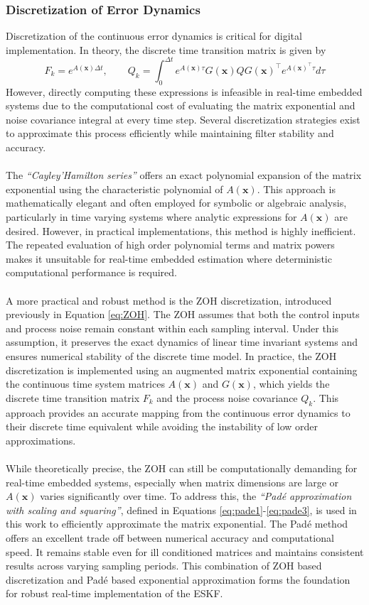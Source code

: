 \subsubsection{Discretization of Error Dynamics}
Discretization of the continuous error dynamics is critical for digital implementation. In theory, the discrete time transition matrix is given by
$$
    F_k = e^{A(\mathbf{x})\Delta t}, \qquad
    Q_k = \int_0^{\Delta t} e^{A(\mathbf{x})\tau} G(\mathbf{x}) Q G(\mathbf{x})^\top e^{A(\mathbf{x})^\top\tau} d\tau
$$
However, directly computing these expressions is infeasible in real-time embedded systems due to the computational cost of evaluating the matrix exponential and noise covariance integral at every time step. Several discretization strategies exist to approximate this process efficiently while maintaining filter stability and accuracy.  
\\ \\
The \textit{``Cayley'Hamilton series''} offers an exact polynomial expansion of the matrix exponential using the characteristic polynomial of $A(\mathbf{x})$. This approach is mathematically elegant and often employed for symbolic or algebraic analysis, particularly in time varying systems where analytic expressions for $A(\mathbf{x})$ are desired. However, in practical implementations, this method is highly inefficient. The repeated evaluation of high order polynomial terms and matrix powers makes it unsuitable for real-time embedded estimation where deterministic computational performance is required.  
\\ \\
A more practical and robust method is the ZOH discretization, introduced previously in Equation \ref{eq:ZOH}. The ZOH assumes that both the control inputs and process noise remain constant within each sampling interval. Under this assumption, it preserves the exact dynamics of linear time invariant systems and ensures numerical stability of the discrete time model. In practice, the ZOH discretization is implemented using an augmented matrix exponential containing the continuous time system matrices $A(\mathbf{x})$ and $G(\mathbf{x})$, which yields the discrete time transition matrix $F_k$ and the process noise covariance $Q_k$. This approach provides an accurate mapping from the continuous error dynamics to their discrete time equivalent while avoiding the instability of low order approximations.  
\\ \\
While theoretically precise, the ZOH can still be computationally demanding for real-time embedded systems, especially when matrix dimensions are large or $A(\mathbf{x})$ varies significantly over time. To address this, the \textit{``Padé approximation with scaling and squaring''}, defined in Equations \ref{eq:pade1}-\ref{eq:pade3}, is used in this work to efficiently approximate the matrix exponential. The Padé method offers an excellent trade off between numerical accuracy and computational speed. It remains stable even for ill conditioned matrices and maintains consistent results across varying sampling periods. This combination of ZOH based discretization and Padé based exponential approximation forms the foundation for robust real-time implementation of the ESKF.  
